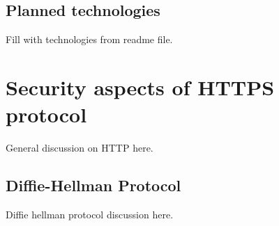 \subsection{Planned technologies}\label{subsec:planned-technologies}
Fill with technologies from readme file.


\section{Security aspects of HTTPS protocol}\label{sec:security-aspects-of-https-protocol}
General discussion on HTTP here.

\subsection{Diffie-Hellman Protocol}\label{subsec:diffie-hellman-protocol}
Diffie hellman protocol discussion here.